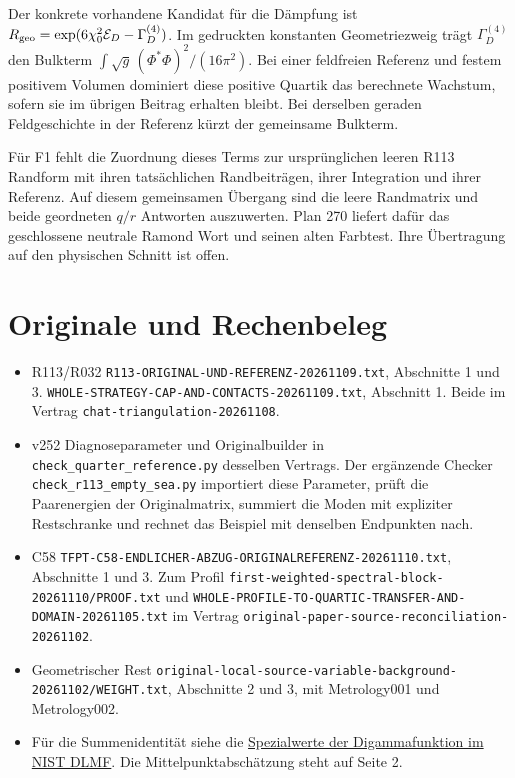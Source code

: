 \documentclass[11pt,a4paper]{article}
\begin{document}
Der konkrete vorhandene Kandidat für die Dämpfung ist \(R_{\rm geo}=\exp(6\chi_0^2\mathcal E_D-\Gamma_D^{(4)})\). Im gedruckten konstanten Geometriezweig trägt \(\Gamma_D^{(4)}\) den Bulkterm \(\int\sqrt g\,(\Phi^*\Phi)^2/(16\pi^2)\). Bei einer feldfreien Referenz und festem positivem Volumen dominiert diese positive Quartik das berechnete Wachstum, sofern sie im übrigen Beitrag erhalten bleibt. Bei derselben geraden Feldgeschichte in der Referenz kürzt der gemeinsame Bulkterm.

Für F1 fehlt die Zuordnung dieses Terms zur ursprünglichen leeren R113 Randform mit ihren tatsächlichen Randbeiträgen, ihrer Integration und ihrer Referenz. Auf diesem gemeinsamen Übergang sind die leere Randmatrix und beide geordneten \(q/r\) Antworten auszuwerten. Plan 270 liefert dafür das geschlossene neutrale Ramond Wort und seinen alten Farbtest. Ihre Übertragung auf den physischen Schnitt ist offen.

\section*{Originale und Rechenbeleg}
\footnotesize
\begin{itemize}\setlength{\itemsep}{1pt}\setlength{\parsep}{0pt}
\item R113/R032 \nolinkurl{R113-ORIGINAL-UND-REFERENZ-20261109.txt}, Abschnitte 1 und 3. \nolinkurl{WHOLE-STRATEGY-CAP-AND-CONTACTS-20261109.txt}, Abschnitt 1. Beide im Vertrag \nolinkurl{chat-triangulation-20261108}.
\item v252 Diagnoseparameter und Originalbuilder in \nolinkurl{check_quarter_reference.py} desselben Vertrags. Der ergänzende Checker \nolinkurl{check_r113_empty_sea.py} importiert diese Parameter, prüft die Paarenergien der Originalmatrix, summiert die Moden mit expliziter Restschranke und rechnet das Beispiel mit denselben Endpunkten nach.
\item C58 \nolinkurl{TFPT-C58-ENDLICHER-ABZUG-ORIGINALREFERENZ-20261110.txt}, Abschnitte 1 und 3. Zum Profil \nolinkurl{first-weighted-spectral-block-20261110/PROOF.txt} und \nolinkurl{WHOLE-PROFILE-TO-QUARTIC-TRANSFER-AND-DOMAIN-20261105.txt} im Vertrag \nolinkurl{original-paper-source-reconciliation-20261102}.
\item Geometrischer Rest \nolinkurl{original-local-source-variable-background-20261102/WEIGHT.txt}, Abschnitte 2 und 3, mit Metrology001 und Metrology002.
\item Für die Summenidentität siehe die \href{https://dlmf.nist.gov/5.4}{Spezialwerte der Digammafunktion im NIST DLMF}. Die Mittelpunktabschätzung steht auf Seite 2.
\end{itemize}
\end{document}
